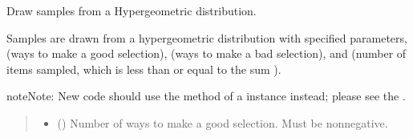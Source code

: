 \documentclass[letterpaper,10pt,english]{sphinxmanual}
\begin{document}
\begin{fulllineitems}
\label{\detokenize{metilda.controllers:metilda.controllers.pitch_art_wizard.harmonicityValueAtTime}}
\pysigstartsignatures
{}
\pysigstopsignatures
\end{fulllineitems}


\begin{fulllineitems}
\label{\detokenize{metilda.controllers:metilda.controllers.pitch_art_wizard.hypergeometric}}
\pysigstartsignatures
{}
\pysigstopsignatures
\sphinxAtStartPar
Draw samples from a Hypergeometric distribution.

\sphinxAtStartPar
Samples are drawn from a hypergeometric distribution with specified
parameters,  (ways to make a good selection),  (ways to make
a bad selection), and  (number of items sampled, which is less
than or equal to the sum ).

\begin{sphinxadmonition}{note}{Note:}
\sphinxAtStartPar
New code should use the
method of a  instance instead;
please see the .
\end{sphinxadmonition}
\begin{quote}\begin{description}
\begin{itemize}
\item {} 
\sphinxAtStartPar
{} () \textendash{} Number of ways to make a good selection.  Must be nonnegative.


\end{itemize}
\end{description}
\end{quote}
\end{fulllineitems}
\end{document}
